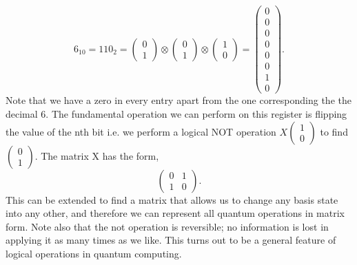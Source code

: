 \begin{equation}
6_{10} = 110_2 =  \begin{pmatrix} 0\\ 1 \end{pmatrix} \otimes \begin{pmatrix} 0\\ 1 \end{pmatrix} \otimes \begin{pmatrix} 1\\ 0 \end{pmatrix} = \begin{pmatrix} 0 \\ 0 \\ 0 \\ 0 \\ 0 \\ 0 \\ 1 \\ 0 \end{pmatrix}.
\end{equation}
Note that we have a zero in every entry apart from the one corresponding the the decimal 6.
The fundamental operation we can perform on this register is flipping the value of the nth bit i.e. we perform a logical NOT operation $ X \begin{pmatrix} 1\\ 0 \end{pmatrix}  $ to find $ \begin{pmatrix} 0\\ 1 \end{pmatrix} $. 
The matrix X has the form,
\begin{equation}
\begin{pmatrix}
 0 & 1 \\ 1 & 0 
\end{pmatrix}.
\end{equation}
This can be extended to find a matrix that allows us to change any basis state into any other, and therefore we can represent all quantum operations in matrix form. Note also that the not operation is reversible; no information is lost in applying it as many times as we like. This turns out to be a general feature of logical operations in quantum computing.


